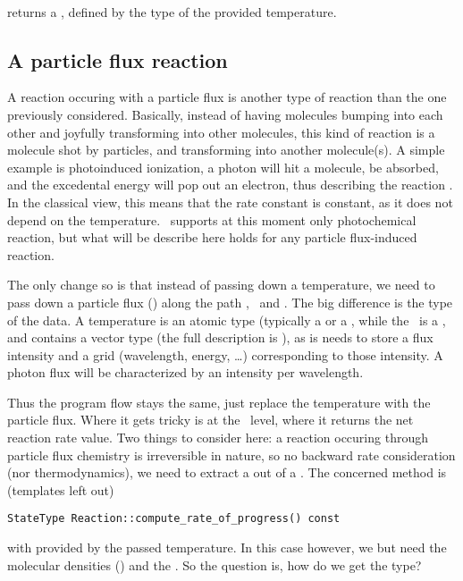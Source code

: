 \paragraph{\KineticsType} returns a , defined by the type of the
provided temperature.

\subsection{A particle flux reaction}

A reaction occuring with a particle flux is another type of reaction than the one
previously considered. Basically, instead of having molecules bumping into each
other and joyfully transforming into other molecules, this kind of reaction is
a molecule shot by particles, and transforming into another molecule(s). A simple
example is photoinduced ionization, a photon will hit a molecule, be absorbed, and
the excedental energy will pop out an electron, thus describing the reaction
. In the classical view, this means that the rate constant
is constant, as it does not depend on the temperature. \Antioch\ supports at this
moment only photochemical reaction, but what will be describe here holds for any
particle flux-induced reaction.

The only change so is that instead of passing down a temperature,
we need to pass down a particle flux (\ParticleFlux) along the path
\KineticsEvaluator, \ReactionSet\ and \Reaction.
The big difference is the type of the data. A temperature is an atomic type (typically
a  or a , while the \ParticleFlux\ is a \ParticleFlux, and
contains a vector type (the full description is \ParticleFlux{}),
as is needs to store a flux intensity and a grid (wavelength, energy, \dots) corresponding
to those intensity. A photon flux will be characterized by an intensity per wavelength.

Thus the program flow stays the same, just replace the temperature with the particle
flux. Where it gets tricky is at the \Reaction\ level, where it returns the net reaction
rate value. Two things to consider here: a reaction occuring through particle flux
chemistry is irreversible in nature, so no backward rate consideration (nor thermodynamics),
we need to extract a  out of a \ParticleFlux{}.
The concerned method is (templates left out)
\begin{center}
\verb!StateType Reaction::compute_rate_of_progress() const!
\end{center}
with  provided by the passed temperature. In this case however, we but
need the molecular densities () and the \ParticleFlux. So the
question is, how do we get the  type?

